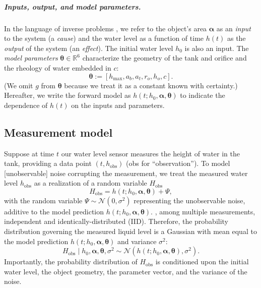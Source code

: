 \documentclass[openacc]{rsproca_new}%
\newcommand\themodel {$h(t; h_0, \boldsymbol \alpha, \boldsymbol\theta)$\xspace}
\newcommand\themodelnomath {h(t; h_0, \boldsymbol \alpha, \boldsymbol\theta)}
\begin{document}
\vspace{-\baselineskip}
\subparagraph{Inputs, output, and model parameters.} 
In the language of inverse problems \cite{groetsch1999inverse,waqar2023tutorial}, we refer to the object's area $\boldsymbol \alpha$ as an \emph{input} to the system (a \emph{cause}) and the water level as a function of time $h(t)$ as the \emph{output} of the system (an \emph{effect}).
The initial water level $h_0$ is also an input.  
The \emph{model parameters} $\boldsymbol \theta \in \mathbb{R}^6$ characterize the geometry of the tank and orifice and the rheology of water embedded in $c$:
\begin{equation}
	\boldsymbol \theta := [h_{\text{max}}, a_b, a_t, r_o, h_o, c]. \label{eq:theta}
\end{equation}
(We omit $g$ from $\boldsymbol \theta$ because we treat it as a constant known with certainty.)
Hereafter, we write the forward model as \themodel to indicate the dependence of $h(t)$ on the inputs and parameters.

\subsection{Measurement model}
Suppose at time $t$ our water level sensor measures the height of water in the tank, providing a data point $(t, h_{\text{obs}})$ (obs for ``observation''). 
To model [unobservable] noise corrupting the measurement, we treat the measured water level $h_{\text{obs}}$ as a realization of a random variable $H_{\text{obs}}$
\begin{equation}
	H_{\text{obs}} = \themodelnomath + \Psi,
\end{equation}
with the random variable $\Psi \sim \mathcal{N}(0, \sigma^2)$ representing the unobservable noise, additive to the model prediction \themodel.
, among multiple measurements, independent and identically-distributed (IID). 
Therefore, the probability distribution governing the measured liquid level is a Gaussian with mean equal to the model prediction \themodel and variance $\sigma^2$:
\begin{equation}
	H_{\text{obs}} \mid h_0, \boldsymbol \alpha, \boldsymbol  \theta, \sigma^2 \sim \mathcal{N}(\themodelnomath, \sigma^2). \label{eq:H_obs_distn}
\end{equation} Importantly, the probability distribution of $H_{\text{obs}}$ is conditioned upon the initial water level, the object geometry, the parameter vector, and the variance of the noise.
\end{document}
